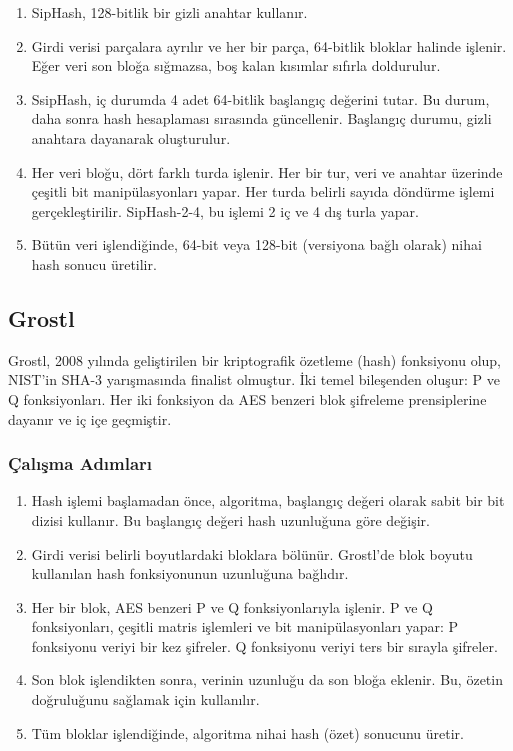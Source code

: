 \begin{enumerate}
    \item SipHash, 128-bitlik bir gizli anahtar kullanır.
    \item Girdi verisi parçalara ayrılır ve her bir parça, 64-bitlik bloklar halinde işlenir. Eğer veri son bloğa sığmazsa, boş kalan kısımlar sıfırla doldurulur.
    \item SsipHash, iç durumda 4 adet 64-bitlik başlangıç değerini tutar. Bu durum, daha sonra hash hesaplaması sırasında güncellenir. Başlangıç durumu, gizli anahtara dayanarak oluşturulur.
    \item Her veri bloğu, dört farklı turda işlenir. Her bir tur, veri ve anahtar üzerinde çeşitli bit manipülasyonları yapar. Her turda belirli sayıda döndürme işlemi gerçekleştirilir. SipHash-2-4, bu işlemi 2 iç ve 4 dış turla yapar.
    \item Bütün veri işlendiğinde, 64-bit veya 128-bit (versiyona bağlı olarak) nihai hash sonucu üretilir.
\end{enumerate}

\newpage

\subsection{Grostl}

Grostl, 2008 yılında geliştirilen bir kriptografik özetleme (hash) fonksiyonu olup, NIST’in SHA-3 yarışmasında finalist olmuştur. İki temel bileşenden oluşur: P ve Q fonksiyonları. Her iki fonksiyon da AES benzeri blok şifreleme prensiplerine dayanır ve iç içe geçmiştir.

\subsubsection{Çalışma Adımları}

\begin{enumerate}
    \item Hash işlemi başlamadan önce, algoritma, başlangıç değeri olarak sabit bir bit dizisi kullanır. Bu başlangıç değeri hash uzunluğuna göre değişir.
    \item Girdi verisi belirli boyutlardaki bloklara bölünür. Grostl'de blok boyutu kullanılan hash fonksiyonunun uzunluğuna bağlıdır.
    \item Her bir blok, AES benzeri P ve Q fonksiyonlarıyla işlenir. P ve Q fonksiyonları, çeşitli matris işlemleri ve bit manipülasyonları yapar: P fonksiyonu veriyi bir kez şifreler. Q fonksiyonu veriyi ters bir sırayla şifreler.
    \item Son blok işlendikten sonra, verinin uzunluğu da son bloğa eklenir. Bu, özetin doğruluğunu sağlamak için kullanılır.
    \item Tüm bloklar işlendiğinde, algoritma nihai hash (özet) sonucunu üretir.
\end{enumerate}

